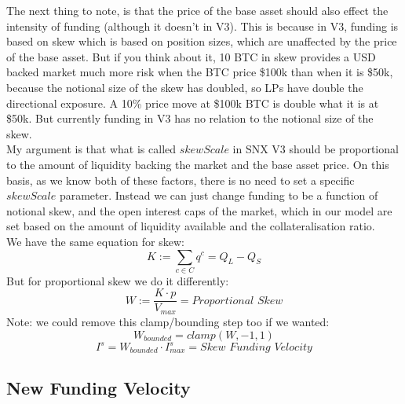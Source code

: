 \documentclass[]{article}
\begin{document}
The next thing to note, is that the price of the base asset should also effect the intensity of funding (although it doesn't in V3). This is because in V3, funding is based on skew which is based on position sizes, which are unaffected by the price of the base asset. But if you think about it, 10 BTC in skew provides a USD backed market much more risk when the BTC price \$100k than when it is \$50k, because the notional size of the skew has doubled, so LPs have double the directional exposure. A 10\% price move at \$100k BTC is double what it is at \$50k. But currently funding in V3 has no relation to the notional size of the skew.\\

My argument is that what is called $skewScale$ in SNX V3 should be proportional to the amount of liquidity backing the market and the base asset price. On this basis, as we know both of these factors, there is no need to set a specific $skewScale$ parameter. Instead we can just change funding to be a function of notional skew, and the open interest caps of the market, which in our model are set based on the amount of liquidity available and the collateralisation ratio.\\

We have the same equation for skew:
\begin{equation}
K := \sum_{c \in C}{q^c} = Q_L - Q_S
\end{equation}
But for proportional skew we do it differently:
\begin{equation}
W := \frac{K \cdot p}{V_{max}} = \textit{Proportional Skew}
\end{equation}
Note: we could remove this clamp/bounding step too if we wanted:
\begin{equation}
W_{\textit{bounded}} = clamp(W, -1, 1)
\end{equation}
\begin{equation}
I^s = W_{\textit{bounded}} \cdot I^s_{max} = \textit{Skew Funding Velocity}
\end{equation}

\subsection{New Funding Velocity}

\end{document}
